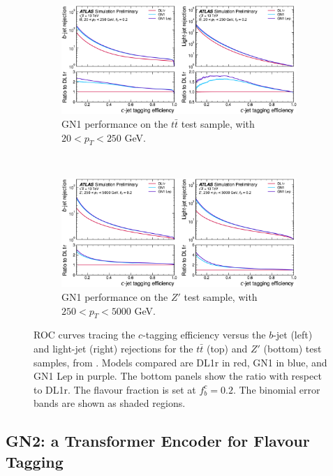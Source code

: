 \begin{figure}[h!]
  \centering
  \begin{subfigure}[b]{0.98\textwidth}
      \centering
      \includegraphics[width=0.98\textwidth]{Images/FTAG/GN/GN1/ROC/ttc.png}
      \caption{GN1 performance on the $t\bar{t}$ test sample, with $20 < p_T < 250$ GeV.} 
      \label{fig:GN1ttc}
  \end{subfigure}\\
  \begin{subfigure}[b]{0.98\textwidth}
    \centering %
      \includegraphics[width=0.98\textwidth]{Images/FTAG/GN/GN1/ROC/zpc.png}
      \caption{GN1 performance on the $Z'$ test sample, with $250 < p_T < 5000$ GeV.} 
      \label{fig:GN1zpc}
  \end{subfigure}
  \caption{ROC curves tracing the $c$-tagging efficiency versus the $b$-jet (left) and light-jet (right) rejections for the $t\bar{t}$ (top) and $Z'$ (bottom) test samples, from \cite{ATL-PHYS-PUB-2022-027}. Models compared are DL1r in red, GN1 in blue, and GN1 Lep in purple. The bottom panels show the ratio with respect to DL1r. The flavour fraction is set at $f^c_b = 0.2$. The binomial error bands are shown as shaded regions.}
  \label{fig:GN1rocc}
\end{figure} 


\subsection{GN2: a Transformer Encoder for Flavour Tagging}\label{chap-GN2}



